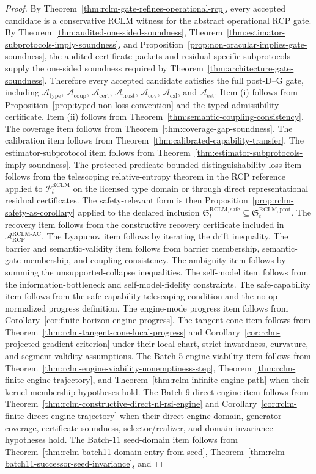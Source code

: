 \documentclass[11pt,a4paper]{article}
\newcommand{\Pcal}{\mathcal P}
\newcommand{\Acal}{\mathcal A}
\newcommand{\calib}{\mathrm{cal}}
\newcommand{\RCP}{\mathrm{RCP}}
\newcommand{\RCLM}{\mathrm{RCLM}}
\newcommand{\AC}{\mathrm{AC}}
\newcommand{\safe}{\mathrm{safe}}
\newcommand{\cert}{\mathrm{cert}}
\newcommand{\coup}{\mathrm{coup}}
\newcommand{\trust}{\mathrm{trust}}
\newcommand{\cov}{\mathrm{cov}}
\newcommand{\est}{\mathrm{est}}
\newcommand{\prot}{\mathrm{prot}}
\begin{document}
\begin{proof}
By Theorem~\ref{thm:rclm-gate-refines-operational-rcp}, every accepted candidate is a conservative RCLM witness for the abstract operational RCP gate. By Theorem~\ref{thm:audited-one-sided-soundness}, Theorem~\ref{thm:estimator-subprotocols-imply-soundness}, and Proposition~\ref{prop:non-oracular-implies-gate-soundness}, the audited certificate packets and residual-specific subprotocols supply the one-sided soundness required by Theorem~\ref{thm:architecture-gate-soundness}. Therefore every accepted candidate satisfies the full post-D--G gate, including \(\Acal_{\mathrm{type}}\), \(\Acal_{\coup}\), \(\Acal_{\cert}\), \(\Acal_{\trust}\), \(\Acal_{\cov}\), \(\Acal_{\calib}\), and \(\Acal_{\est}\).  Item (i) follows from Proposition~\ref{prop:typed-non-loss-convention} and the typed admissibility certificate.  Item (ii) follows from Theorem~\ref{thm:semantic-coupling-consistency}. The coverage item follows from Theorem~\ref{thm:coverage-gap-soundness}. The calibration item follows from Theorem~\ref{thm:calibrated-capability-transfer}. The estimator-subprotocol item follows from Theorem~\ref{thm:estimator-subprotocols-imply-soundness}. The protected-predicate bounded distinguishability-loss item follows from the telescoping relative-entropy theorem in the RCP reference applied to \(\Pcal_t^{\RCLM}\) on the licensed type domain or through direct representational residual certificates.  The safety-relevant form is then Proposition~\ref{prop:rclm-safety-as-corollary} applied to the declared inclusion \(\mathfrak S_t^{\RCLM,\safe}\subseteq\mathfrak S_t^{\RCLM,\prot}\).  The recovery item follows from the constructive recovery certificate included in \(\Acal_{\RCP}^{\RCLM\text{-}\AC}\).  The Lyapunov item follows by iterating the drift inequality.  The barrier and semantic-validity item follows from barrier membership, semantic-gate membership, and coupling consistency.  The ambiguity item follows by summing the unsupported-collapse inequalities.  The self-model item follows from the information-bottleneck and self-model-fidelity constraints.  The safe-capability item follows from the safe-capability telescoping condition and the no-op-normalized progress definition. The engine-mode progress item follows from Corollary~\ref{cor:finite-horizon-engine-progress}.  The tangent-cone item follows from Theorem~\ref{thm:rclm-tangent-cone-local-progress} and Corollary~\ref{cor:rclm-projected-gradient-criterion} under their local chart, strict-inwardness, curvature, and segment-validity assumptions. The Batch-5 engine-viability item follows from Theorem~\ref{thm:rclm-engine-viability-nonemptiness-step}, Theorem~\ref{thm:rclm-finite-engine-trajectory}, and Theorem~\ref{thm:rclm-infinite-engine-path} when their kernel-membership hypotheses hold. The Batch-9 direct-engine item follows from Theorem~\ref{thm:rclm-constructive-direct-nl-rsi-engine} and Corollary~\ref{cor:rclm-finite-direct-engine-trajectory} when their direct-engine-domain, generator-coverage, certificate-soundness, selector/realizer, and domain-invariance hypotheses hold. The Batch-11 seed-domain item follows from Theorem~\ref{thm:rclm-batch11-domain-entry-from-seed}, Theorem~\ref{thm:rclm-batch11-successor-seed-invariance}, and 
\end{proof}
\end{document}
